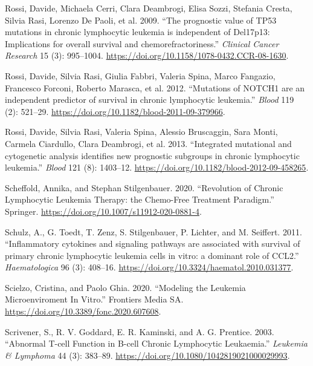 \documentclass[11pt, a4paper, twosided]{book}
\newenvironment{CSLReferences}%
  {}%
  {\par}
\begin{document}
\begin{CSLReferences}{1}{0}
\leavevmode{}%
Rossi, Davide, Michaela Cerri, Clara Deambrogi, Elisa Sozzi, Stefania Cresta, Silvia Rasi, Lorenzo De Paoli, et al. 2009. {``{The prognostic value of TP53 mutations in chronic lymphocytic leukemia is independent of Del17p13: Implications for overall survival and chemorefractoriness}.''} \emph{Clinical Cancer Research} 15 (3): 995--1004. \url{https://doi.org/10.1158/1078-0432.CCR-08-1630}.

\leavevmode{}%
Rossi, Davide, Silvia Rasi, Giulia Fabbri, Valeria Spina, Marco Fangazio, Francesco Forconi, Roberto Marasca, et al. 2012. {``{Mutations of NOTCH1 are an independent predictor of survival in chronic lymphocytic leukemia}.''} \emph{Blood} 119 (2): 521--29. \url{https://doi.org/10.1182/blood-2011-09-379966}.

\leavevmode{}%
Rossi, Davide, Silvia Rasi, Valeria Spina, Alessio Bruscaggin, Sara Monti, Carmela Ciardullo, Clara Deambrogi, et al. 2013. {``{Integrated mutational and cytogenetic analysis identifies new prognostic subgroups in chronic lymphocytic leukemia}.''} \emph{Blood} 121 (8): 1403--12. \url{https://doi.org/10.1182/blood-2012-09-458265}.

\leavevmode{}%
Scheffold, Annika, and Stephan Stilgenbauer. 2020. {``{Revolution of Chronic Lymphocytic Leukemia Therapy: the Chemo-Free Treatment Paradigm}.''} Springer. \url{https://doi.org/10.1007/s11912-020-0881-4}.

\leavevmode{}%
Schulz, A., G. Toedt, T. Zenz, S. Stilgenbauer, P. Lichter, and M. Seiffert. 2011. {``{Inflammatory cytokines and signaling pathways are associated with survival of primary chronic lymphocytic leukemia cells in vitro: a dominant role of CCL2}.''} \emph{Haematologica} 96 (3): 408--16. \url{https://doi.org/10.3324/haematol.2010.031377}.

\leavevmode{}%
Scielzo, Cristina, and Paolo Ghia. 2020. {``{Modeling the Leukemia Microenviroment In Vitro}.''} Frontiers Media SA. \url{https://doi.org/10.3389/fonc.2020.607608}.

\leavevmode{}%
Scrivener, S., R. V. Goddard, E. R. Kaminski, and A. G. Prentice. 2003. {``{Abnormal T-cell Function in B-cell Chronic Lymphocytic Leukaemia}.''} \emph{Leukemia \& Lymphoma} 44 (3): 383--89. \url{https://doi.org/10.1080/1042819021000029993}.


\end{CSLReferences}
\end{document}
